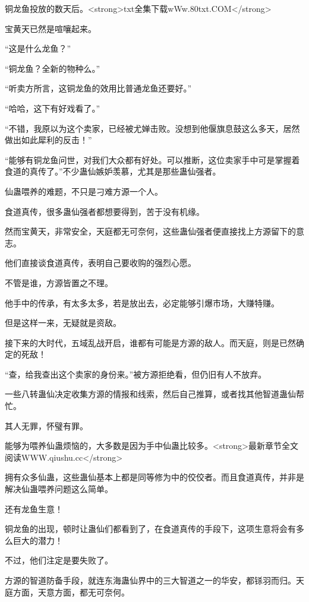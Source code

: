 
\begin{this_body}

铜龙鱼投放的数天后。<strong>txt全集下载wWw.80txt.COM</strong>

宝黄天已然是喧嚷起来。

“这是什么龙鱼？”

“铜龙鱼？全新的物种么。”

“听卖方所言，这铜龙鱼的效用比普通龙鱼还要好。”

“哈哈，这下有好戏看了。”

“不错，我原以为这个卖家，已经被尤婵击败。没想到他偃旗息鼓这么多天，居然做出如此犀利的反击！”

“能够有铜龙鱼问世，对我们大众都有好处。可以推断，这位卖家手中可是掌握着食道的真传了。”不少蛊仙嫉妒羡慕，尤其是那些蛊仙强者。

仙蛊喂养的难题，不只是刁难方源一个人。

食道真传，很多蛊仙强者都想要得到，苦于没有机缘。

然而宝黄天，非常安全，天庭都无可奈何，这些蛊仙强者便直接找上方源留下的意志。

他们直接谈食道真传，表明自己要收购的强烈心愿。

不管是谁，方源皆置之不理。

他手中的传承，有太多太多，若是放出去，必定能够引爆市场，大赚特赚。

但是这样一来，无疑就是资敌。

接下来的大时代，五域乱战开启，谁都有可能是方源的敌人。而天庭，则是已然确定的死敌！

“查，给我查出这个卖家的身份来。”被方源拒绝看，但仍旧有人不放弃。

一些八转蛊仙决定收集方源的情报和线索，然后自己推算，或者找其他智道蛊仙帮忙。

其人无罪，怀璧有罪。

能够为喂养仙蛊烦恼的，大多数是因为手中仙蛊比较多。<strong>最新章节全文阅读WWW.qiushu.cc</strong>

拥有众多仙蛊，这些蛊仙基本上都是同等修为中的佼佼者。而且食道真传，并非是解决仙蛊喂养问题这么简单。

还有龙鱼生意！

铜龙鱼的出现，顿时让蛊仙们都看到了，在食道真传的手段下，这项生意将会有多么巨大的潜力！

不过，他们注定是要失败了。

方源的智道防备手段，就连东海蛊仙界中的三大智道之一的华安，都铩羽而归。天庭方面，天意方面，都无可奈何。


\end{this_body}
